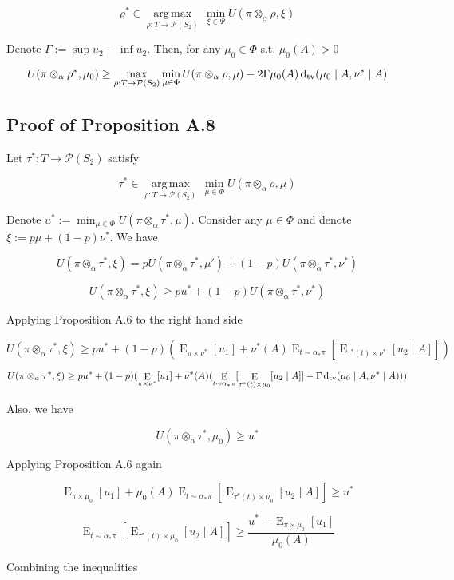 \documentclass[a4paper]{article}
\DeclareMathOperator{\E}{E}
\newcommand{\Dtv}{\operatorname{d}_{\textnormal{tv}}}
\newcommand{\Argmax}[1]{\underset{#1}{\operatorname{arg\,max}}\,}
\newcommand{\Prob}{\mathcal{P}}
\begin{document}
$$\rho^* \in \Argmax{\rho: T \rightarrow \Prob(S_2)} \min_{\xi \in \Psi} U(\pi \otimes_\alpha \rho, \xi)$$

Denote ${\Gamma := \sup u_2 - \inf u_2}$. Then, for any ${\mu_0 \in \Phi}$ s.t. ${\mu_0(A) > 0}$

$$U(\pi \otimes_\alpha \rho^*,\mu_0) \geq \max_{\rho: T \rightarrow \Prob(S_2)} \min_{\mu \in \Phi} U(\pi \otimes_\alpha \rho, \mu)-2\Gamma\mu_0(A)\Dtv(\mu_0 \mid A, \nu^* \mid A)$$

\subsection{Proof of Proposition A.8}

Let ${\tau^*: T \rightarrow \Prob(S_2)}$ satisfy

$$\tau^* \in \Argmax{\rho: T \rightarrow \Prob(S_2)} \min_{\mu \in \Phi} U(\pi \otimes_\alpha \rho, \mu)$$

Denote ${u^*:= \min_{\mu \in \Phi} U(\pi \otimes_\alpha \tau^*, \mu)}$. Consider any ${\mu \in \Phi}$ and denote ${\xi:=p\mu+(1-p)\nu^*}$. We have

$$U(\pi \otimes_\alpha \tau^*, \xi) = p U(\pi \otimes_\alpha \tau^*, \mu') + (1-p) U(\pi \otimes_\alpha \tau^*, \nu^*)$$

$$U(\pi \otimes_\alpha \tau^*, \xi) \geq pu^* + (1-p) U(\pi \otimes_\alpha \tau^*, \nu^*)$$

Applying Proposition A.6 to the right hand side

$$U(\pi \otimes_\alpha \tau^*, \xi) \geq pu^* + (1-p) (\E_{\pi \times \nu^*}[u_1] + \nu^*(A)\E_{t \sim \alpha_* \pi}[\E_{\tau^*(t) \times \nu^*}[u_2 \mid A]])$$

$$U(\pi \otimes_\alpha \tau^*, \xi) \geq pu^* + (1-p) (\E_{\pi \times \nu^*}[u_1] + \nu^*(A)(\E_{t \sim \alpha_* \pi}[\E_{\tau^*(t) \times \mu_0}[u_2 \mid A]]- \Gamma\Dtv(\mu_0 \mid A, \nu^* \mid A)))$$

Also, we have

$$U(\pi \otimes_\alpha \tau^*, \mu_0) \geq u^*$$

Applying Proposition A.6 again

$$\E_{\pi \times \mu_0}[u_1] + \mu_0(A)\E_{t \sim \alpha_* \pi}[\E_{\tau^*(t) \times \mu_0}[u_2 \mid A]] \geq u^*$$

$$\E_{t \sim \alpha_* \pi}[\E_{\tau^*(t) \times \mu_0}[u_2 \mid A]] \geq \frac{u^* - \E_{\pi \times \mu_0}[u_1]}{\mu_0(A)}$$

Combining the inequalities
\end{document}
